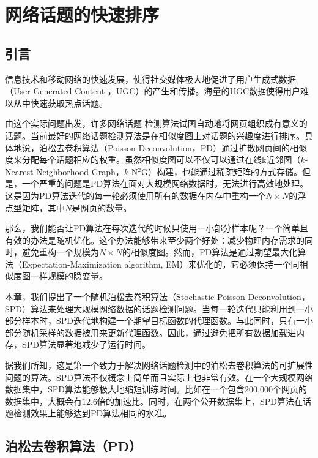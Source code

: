 \chapter{网络话题的快速排序} \label{chap:topicsSort}
\section{引言}
信息技术和移动网络的快速发展，使得社交媒体极大地促进了用户生成式数据（User-Generated Content ，UGC）\citep{pang-2013-unsupervised}的产生和传播。海量的UGC数据使得用户难以从中快速获取热点话题。

由这个实际问题出发，许多网络话题
检测算法\citep{pang-2013-unsupervised,zhang-2013-cross,pang-tao-2016-lpd}试图自动地将网页组织成有意义的话题。当前最好的网络话题检测算法是在相似度图上对话题的兴趣度进行排序\citep{pang-2013-unsupervised, pang-tao-2018-neurocomputing}。具体地说，泊松去卷积算法（Poisson Deconvolution，PD）通过扩散网页间的相似度来分配每个话题相应的权重\citep{pang-2013-unsupervised}。虽然相似度图可以不仅可以通过在线k近邻图（$k$-Nearest Neighborhood Graph，$k$-N$^2$G）\citep{debatty-2016-fastonlineknn}构建，也能通过稀疏矩阵的方式存储。但是，一个严重的问题是PD算法在面对大规模网络数据时，无法进行高效地处理。这是因为PD算法迭代的每一轮必须使用所有的数据在内存中重构一个$N\times N$的浮点型矩阵，其中$N$是网页的数量。

那么，我们能否让PD算法在每次迭代的时候只使用一小部分样本呢？一个简单且有效的办法是随机优化\citep{hannah-2015-Stochastic}。这个办法能够带来至少两个好处：减少物理内存需求的同时，避免重构一个规模为$N\times N$的相似度图。然而，PD算法是通过期望最大化算法（Expectation-Maximization algorithm, EM）来优化的，它必须保持一个同相似度图一样规模的隐变量。

本章，我们提出了一个随机泊松去卷积算法（Stochastic Poisson Deconvolution，SPD）算法来处理大规模网络数据的话题检测问题。当每一轮迭代只能利用到一小部分样本时，SPD迭代地构建一个期望目标函数的代理函数。与此同时，只有一小部分随机采样的数据被用来更新代理函数。因此，通过避免把所有数据加载进内存，SPD算法显著地减少了运行时间。

据我们所知，这是第一个致力于解决网络话题检测中的泊松去卷积算法的可扩展性问题的算法。SPD算法不仅概念上简单而且实际上也非常有效。在一个大规模网络数据集中，SPD算法能够极大地缩短训练时间。比如在一个包含200,000个网页的数据集中，大概会有$12.6$倍的加速比。同时，在两个公开数据集上，SPD算法在话题检测效果上能够达到PD算法相同的水准。

\section{泊松去卷积算法（PD）}

